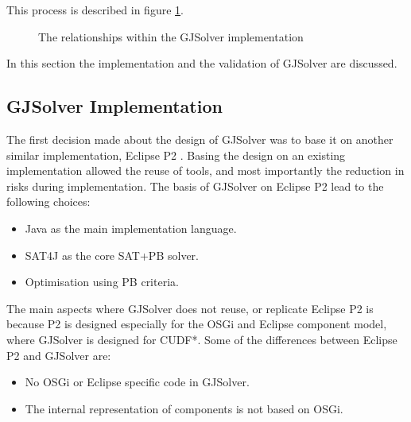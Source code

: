 This process is described in figure \ref{impl.modelofgjsolver}.
\begin{figure}[htp]
\begin{center}
  \caption{The relationships within the GJSolver implementation}
  \label{impl.modelofgjsolver}
\end{center}
\end{figure}

In this section the implementation and the validation of GJSolver are discussed.

\subsection{GJSolver Implementation}
\label{impl.gjsolverimpl}
The first decision made about the design of GJSolver was to base it on another similar implementation, Eclipse P2 \citep{le_berre_dependency_2009,leBerre2010}.
Basing the design on an existing implementation allowed the reuse of tools, and most importantly the reduction in risks during implementation.
The basis of GJSolver on Eclipse P2 lead to the following choices:
\begin{itemize}
  \item Java as the main implementation language.
  \item SAT4J as the core SAT+PB solver.
  \item Optimisation using PB criteria.
\end{itemize}

The main aspects where GJSolver does not reuse, or replicate Eclipse P2 is because P2 is designed especially for the OSGi and Eclipse component model, where GJSolver is designed for CUDF*.
Some of the differences between Eclipse P2 and GJSolver are:
\begin{itemize}
  \item No OSGi or Eclipse specific code in GJSolver.
  \item The internal representation of components is not based on OSGi.
\end{itemize}

